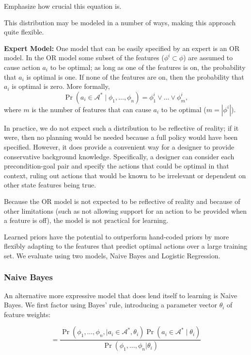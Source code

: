 \documentclass[11pt]{article}
\begin{document}
Emphasize how crucial this equation is.

This distribution may be modeled in a number of ways, making this
approach quite flexible. 

{\bf Expert Model:} One model that can be easily specified by
an expert is an OR model.
In the OR model some subset of the features 
($\phi^i \subset \phi$) are
assumed to cause action $a_i$ to be optimal; as long as one of
the features is on, the probability that $a_i$ is optimal is one.
If none of the features are on, then the probability that $a_i$ is 
optimal is zero. More formally,
\begin{equation}
\Pr(a_i \in \mathcal{A}^*  \mid \phi_1, \ldots, \phi_n) = \phi_1^i \lor ... \lor \phi_m^i,
\end{equation}
where $m$ is the number of features that can cause $a_i$ to be optimal ($m = |\phi^i|$).

In practice, we do not expect such a distribution to be reflective of
reality; if it were, then no planning would be needed because a full
policy would have been specified. However, it does provide a
convenient way for a designer to provide conservative background
knowledge. Specifically, a designer can consider each precondition-goal
pair and specify the actions that could be optimal in that context, ruling
out actions that would be known to be irrelevant or dependent on other
state features being true.

Because the OR model is not expected to be reflective of
reality and because of other limitations (such as not allowing support
for an action to be provided when a feature is off), the model is not
practical for learning.

Learned priors have the potential to outperform
hand-coded priors by more flexibly adapting to the
features that predict optimal actions over a large training set.
We evaluate using two models, Naive Bayes and Logistic Regression.

\subsubsection{Naive Bayes}
An alternative more expressive model that does lend itself to learning is
Naive Bayes. We first factor using Bayes' rule, introducing a parameter vector $\theta_i$ of
feature weights:

\begin{equation}
= \frac{\Pr(\phi_1, \ldots, \phi_{n}, \mid a_i \in \mathcal{A}^*, \theta_i) \Pr(a_i \in \mathcal{A}^* \mid \theta_i)}{\Pr(\phi_1, \ldots, \phi_{n} | \theta_i)}
\label{eq:bayes}
\end{equation}
\end{document}
